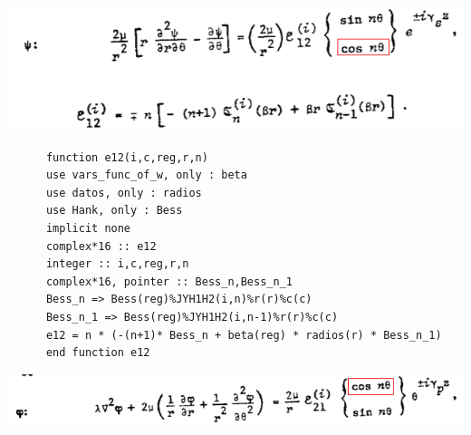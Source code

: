\documentclass [11pt,spanish]{article}
\begin{document}
\endgroup
\includegraphics[scale=0.5]{e12}
\begingroup
\fontsize{10pt}{12pt}
\selectfont
{}
\begin{shaded}
\begin{verbatim}
      function e12(i,c,reg,r,n)
      use vars_func_of_w, only : beta
      use datos, only : radios
      use Hank, only : Bess
      implicit none
      complex*16 :: e12
      integer :: i,c,reg,r,n
      complex*16, pointer :: Bess_n,Bess_n_1
      Bess_n => Bess(reg)%JYH1H2(i,n)%r(r)%c(c)
      Bess_n_1 => Bess(reg)%JYH1H2(i,n-1)%r(r)%c(c)
      e12 = n * (-(n+1)* Bess_n + beta(reg) * radios(r) * Bess_n_1)
      end function e12
\end{verbatim}
\end{shaded}
\endgroup
\includegraphics[scale=0.5]{e21a}
\end{document}
